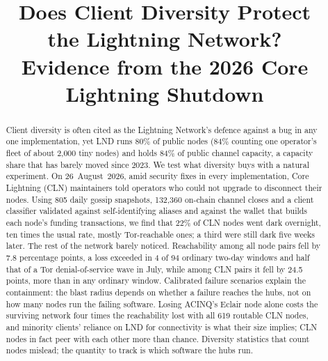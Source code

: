 \documentclass[conference]{IEEEtran}
\begin{document}
\title{Does Client Diversity Protect\\ the Lightning Network?\\
{\LARGE Evidence from the 2026 Core Lightning Shutdown}}

\author{
}

\maketitle
\thispagestyle{plain}
\pagestyle{plain}

\begin{abstract}
Client diversity is often cited as the Lightning Network's defence against a bug in any one implementation, yet
LND runs 80\% of public nodes (84\% counting one operator's fleet of about 2,000 tiny nodes) and holds 84\% of
public channel capacity, a capacity share that has barely moved since 2023.
We test what diversity buys with a natural experiment. On 26~August~2026, amid security fixes in every
implementation, Core Lightning (CLN) maintainers told operators who could not upgrade to disconnect their nodes.
Using 805 daily gossip snapshots, 132,360 on-chain channel closes and a client classifier validated against
self-identifying aliases and against the wallet that builds each node's funding transactions, we find that 22\% of
CLN nodes went dark overnight, ten times the usual rate, mostly Tor-reachable ones; a third were still dark
five weeks later. The rest of the network barely noticed. Reachability among all node pairs fell by 7.8
percentage points, a loss exceeded in 4 of 94 ordinary two-day windows and half that of a Tor denial-of-service
wave in July, while among CLN pairs it fell by 24.5 points, more than in any ordinary window. Calibrated failure
scenarios explain the containment: the blast radius depends on whether a failure reaches the hubs, not on how many
nodes run the failing software. Losing ACINQ's Eclair node alone costs the surviving network four times the reachability
lost with all 619 routable CLN nodes, and minority clients' reliance on LND for connectivity is what their size
implies; CLN nodes in fact peer with each other more than chance. Diversity statistics that count nodes mislead;
the quantity to track is which software the hubs run.
\end{abstract}
\end{document}
